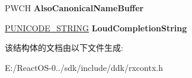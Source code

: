 \begin{DoxyCompactItemize}
\begin{tabbing}
\end{tabbing}\item 
\mbox{\label{struct___r_x___c_o_n_t_e_x_t_a30684e26a32f67d14c5de2848381e9bb}} 
P\+W\+CH {\bfseries Also\+Canonical\+Name\+Buffer}
\item 
\mbox{\label{struct___r_x___c_o_n_t_e_x_t_a45fe97d5ef82b6f9c7d6062304e9261c}} 
\hyperlink{struct___u_n_i_c_o_d_e___s_t_r_i_n_g}{P\+U\+N\+I\+C\+O\+D\+E\+\_\+\+S\+T\+R\+I\+NG} {\bfseries Loud\+Completion\+String}
\end{DoxyCompactItemize}


该结构体的文档由以下文件生成\+:\begin{DoxyCompactItemize}
\item 
E\+:/\+React\+O\+S-\/0../sdk/include/ddk/rxcontx.\+h\end{DoxyCompactItemize}
